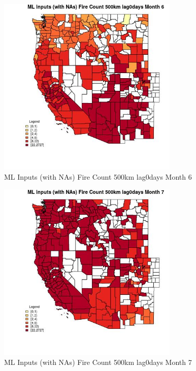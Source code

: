 \begin{figure} 
\centering  
\includegraphics[width=0.77\textwidth]{Code_Outputs/Report_ML_input_PM25_Step4_part_f_de_duplicated_aveswNAs_CountyFire_Count_500km_lag0daysmedianMonth6.jpg} 
\caption{\label{fig:Report_ML_input_PM25_Step4_part_f_de_duplicated_aveswNAsCountyFire_Count_500km_lag0daysmedianMonth6}ML Inputs (with NAs) Fire Count 500km lag0days Month 6} 
\end{figure} 
 

\begin{figure} 
\centering  
\includegraphics[width=0.77\textwidth]{Code_Outputs/Report_ML_input_PM25_Step4_part_f_de_duplicated_aveswNAs_CountyFire_Count_500km_lag0daysmedianMonth7.jpg} 
\caption{\label{fig:Report_ML_input_PM25_Step4_part_f_de_duplicated_aveswNAsCountyFire_Count_500km_lag0daysmedianMonth7}ML Inputs (with NAs) Fire Count 500km lag0days Month 7} 
\end{figure} 
 

